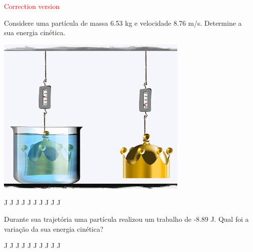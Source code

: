\documentclass[12pt, addpoints]{exam}
\begin{document}
        \begin{center}
\textcolor{red}{\emph\Large Correction version}\end{center}
\begin{questions}
\begin{multicols*}{2}
\question[33] Considere uma partícula de massa    6.53 kg e velocidade    8.76 m/s. Determine a sua energia cinética.

\begin{center}
\begin{minipage}[c]{0.75\linewidth}
\includegraphics[width=\textwidth]{MWE001.jpg}
\end{minipage}

\end{center}
\begin{oneparchoices}
 J J J J J J J J J J\end{oneparchoices}

\begin{oneparchoices}
\end{oneparchoices}
\question[23] Durante sua trajetória uma partícula realizou um trabalho de   -8.89 J. Qual foi a variação da sua energia cinética?

\begin{oneparchoices}
 J J J J J J J J J J\end{oneparchoices}

\begin{oneparchoices}
\end{oneparchoices}
\end{multicols*}
\end{questions}
\end{document}
